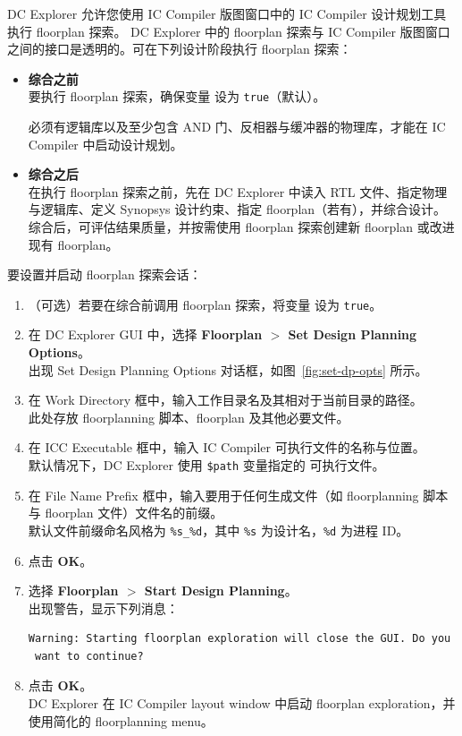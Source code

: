 DC Explorer 允许您使用 IC Compiler 版图窗口中的 IC Compiler 设计规划工具执行 floorplan 探索。
DC Explorer 中的 floorplan 探索与 IC Compiler 版图窗口之间的接口是透明的。可在下列设计阶段执行 floorplan 探索：
\begin{itemize}
  \item \textbf{综合之前}\\
        要执行 floorplan 探索，确保变量  设为 \texttt{true}（默认）。
\begin{noteBox}
必须有逻辑库以及至少包含 AND 门、反相器与缓冲器的物理库，才能在 IC Compiler 中启动设计规划。
\end{noteBox}
  \item \textbf{综合之后}\\
        在执行 floorplan 探索之前，先在 DC Explorer 中读入 RTL 文件、指定物理与逻辑库、定义 Synopsys 设计约束、指定 floorplan（若有），并综合设计。
        综合后，可评估结果质量，并按需使用 floorplan 探索创建新 floorplan 或改进现有 floorplan。
\end{itemize}

要设置并启动 floorplan 探索会话：
\begin{enumerate}
  \item （可选）若要在综合前调用 floorplan 探索，将变量  设为 \texttt{true}。
  \item 在 DC Explorer GUI 中，选择 \textbf{Floorplan $>$ Set Design Planning Options}。\\
        出现 Set Design Planning Options 对话框，如图~\ref{fig:set-dp-opts} 所示。
  \item 在 Work Directory 框中，输入工作目录名及其相对于当前目录的路径。\\
        此处存放 floorplanning 脚本、floorplan 及其他必要文件。
  \item 在 ICC Executable 框中，输入 IC Compiler 可执行文件的名称与位置。\\
        默认情况下，DC Explorer 使用 \texttt{\$path} 变量指定的  可执行文件。
  \item 在 File Name Prefix 框中，输入要用于任何生成文件（如 floorplanning 脚本与 floorplan 文件）文件名的前缀。\\
        默认文件前缀命名风格为 \texttt{\%s\_\%d}，其中 \texttt{\%s} 为设计名，\texttt{\%d} 为进程 ID。
  \item 点击 \textbf{OK}。
  \item 选择 \textbf{Floorplan $>$ Start Design Planning}。\\
        出现警告，显示下列消息：
\begin{lstlisting}
Warning: Starting floorplan exploration will close the GUI. Do you
 want to continue?
\end{lstlisting}
  \item 点击 \textbf{OK}。\\
        DC Explorer 在 IC Compiler layout window 中启动 floorplan exploration，并使用简化的 floorplanning menu。
\end{enumerate}

